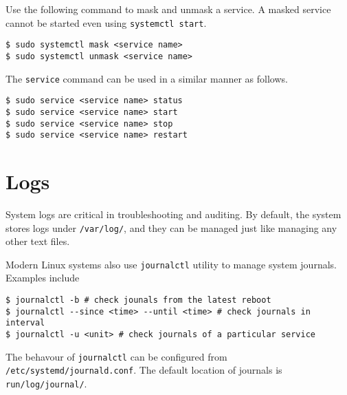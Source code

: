 Use the following command to mask and unmask a service. A masked service cannot be started even using \verb|systemctl start|.
\begin{lstlisting}
$ sudo systemctl mask <service name>
$ sudo systemctl unmask <service name>
\end{lstlisting}

The \verb|service| command can be used in a similar manner as follows.
\begin{lstlisting}
$ sudo service <service name> status
$ sudo service <service name> start
$ sudo service <service name> stop
$ sudo service <service name> restart
\end{lstlisting}

\section{Logs}

System logs are critical in troubleshooting and auditing. By default, the system stores logs under \verb|/var/log/|, and they can be managed just like managing any other text files.

Modern Linux systems also use \verb|journalctl| utility to manage system journals. Examples include
\begin{lstlisting}
$ journalctl -b # check jounals from the latest reboot
$ journalctl --since <time> --until <time> # check journals in interval
$ journalctl -u <unit> # check journals of a particular service
\end{lstlisting}
The behavour of \verb|journalctl| can be configured from \texttt{/etc/systemd/journald.conf}. The default location of journals is \texttt{run/log/journal/}.














